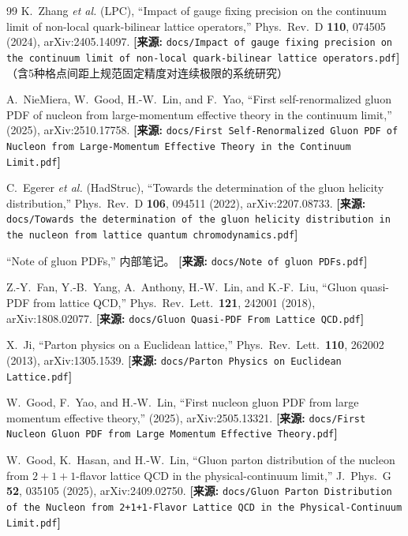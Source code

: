 \documentclass[12pt,a4paper]{ctexart}
\theoremstyle{definition}
\begin{document}
\begin{thebibliography}{99}
K.~Zhang \textit{et al.} (LPC),
``Impact of gauge fixing precision on the continuum limit of non-local quark-bilinear lattice operators,''
Phys.\ Rev.\ D \textbf{110}, 074505 (2024), arXiv:2405.14097.
\quad\textbf{[来源:} \texttt{docs/Impact of gauge fixing precision on the continuum limit of non-local quark-bilinear lattice operators.pdf}\textbf{]}
（含5种格点间距上规范固定精度对连续极限的系统研究）

A.~NieMiera, W.~Good, H.-W.~Lin, and F.~Yao,
``First self-renormalized gluon PDF of nucleon from large-momentum effective theory in the continuum limit,''
(2025), arXiv:2510.17758.
\quad\textbf{[来源:} \texttt{docs/First Self-Renormalized Gluon PDF of Nucleon from Large-Momentum Effective Theory in the Continuum Limit.pdf}\textbf{]}

C.~Egerer \textit{et al.} (HadStruc),
``Towards the determination of the gluon helicity distribution,''
Phys.\ Rev.\ D \textbf{106}, 094511 (2022), arXiv:2207.08733.
\quad\textbf{[来源:} \texttt{docs/Towards the determination of the gluon helicity distribution in the nucleon from lattice quantum chromodynamics.pdf}\textbf{]}

``Note of gluon PDFs,'' 内部笔记。
\quad\textbf{[来源:} \texttt{docs/Note of gluon PDFs.pdf}\textbf{]}

Z.-Y.~Fan, Y.-B.~Yang, A.~Anthony, H.-W.~Lin, and K.-F.~Liu,
``Gluon quasi-PDF from lattice QCD,''
Phys.\ Rev.\ Lett.\ \textbf{121}, 242001 (2018), arXiv:1808.02077.
\quad\textbf{[来源:} \texttt{docs/Gluon Quasi-PDF From Lattice QCD.pdf}\textbf{]}

X.~Ji,
``Parton physics on a Euclidean lattice,''
Phys.\ Rev.\ Lett.\ \textbf{110}, 262002 (2013), arXiv:1305.1539.
\quad\textbf{[来源:} \texttt{docs/Parton Physics on Euclidean Lattice.pdf}\textbf{]}

W.~Good, F.~Yao, and H.-W.~Lin,
``First nucleon gluon PDF from large momentum effective theory,''
(2025), arXiv:2505.13321.
\quad\textbf{[来源:} \texttt{docs/First Nucleon Gluon PDF from Large Momentum Effective Theory.pdf}\textbf{]}

W.~Good, K.~Hasan, and H.-W.~Lin,
``Gluon parton distribution of the nucleon from $2+1+1$-flavor lattice QCD in the physical-continuum limit,''
J.\ Phys.\ G \textbf{52}, 035105 (2025), arXiv:2409.02750.
\quad\textbf{[来源:} \texttt{docs/Gluon Parton Distribution of the Nucleon from 2+1+1-Flavor Lattice QCD in the Physical-Continuum Limit.pdf}\textbf{]}

\end{thebibliography}
\end{document}
